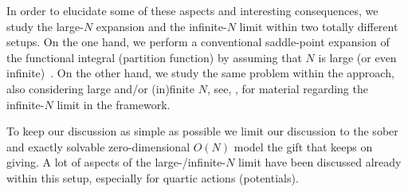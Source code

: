 In order to elucidate some of these aspects and interesting consequences, we study the large-$N$ expansion and the infinite-$N$ limit within two totally different setups.
On the one hand, we perform a conventional saddle-point expansion of the functional integral (partition function) by assuming that $N$ is large (or even infinite)~\cite{Arfken:2005,Keitel:2011pn}.
On the other hand, we study the same problem within the \frg{} approach, also considering large and/or (in)finite $N$, see, \eg{},  for material regarding the infinite-$N$ limit in the \frg{} framework.

To keep our discussion as simple as possible we limit our discussion to the sober and exactly solvable zero-dimensional $O(N)$ model \dash{} the gift that keeps on giving.
A lot of aspects of the large-/infinite-$N$ limit have been discussed already within this setup, \cf{}  \dash{} especially for quartic actions (potentials).

